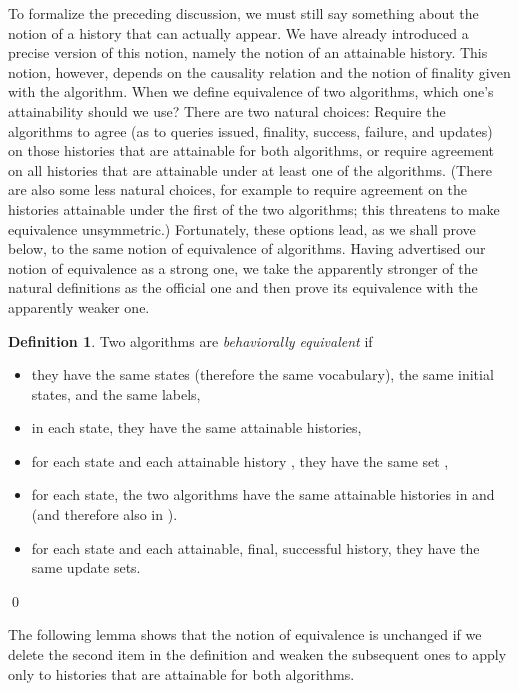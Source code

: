 \documentclass{LMCS}
\theoremstyle{definition}
\newtheorem{df}[thm]{Definition}
\newenvironment{ls}{\begin{itemize}}{\end{itemize}}
\begin{document}
To formalize the preceding discussion, we must still say something
about the notion of a history that can actually appear.  We have
already introduced a precise version of this notion, namely the notion
of an attainable history.  This notion, however, depends on the
causality relation and the notion of finality given with the
algorithm.  When we define equivalence of two algorithms, which one's
attainability should we use?  There are two natural choices: Require
the algorithms to agree (as to queries issued, finality, success,
failure, and updates) on those histories that are attainable for both
algorithms, or require agreement on all histories that are attainable
under at least one of the algorithms.  (There are also some less
natural choices, for example to require agreement on the histories
attainable under the first of the two algorithms; this threatens to
make equivalence unsymmetric.)  Fortunately, these options lead, as we
shall prove below, to the same notion of equivalence of algorithms.
Having advertised our notion of equivalence as a strong one, we take
the apparently stronger of the natural definitions as the official one
and then prove its equivalence with the apparently weaker one.

\begin{df}   \label{equiv-def}
Two algorithms are \emph{behaviorally equivalent} if
\begin{ls}
  \item they have the same states (therefore the same vocabulary), the
  same initial states, and the same labels,
  \item in each state, they have the same attainable histories,
  \item for each state  and each attainable history , they
  have the same set ,
  \item for each state, the two algorithms have the same attainable
  histories in 
  and  (and therefore also in ).
  \item for each state and each attainable, final, successful
  history, they have the same update sets.
\end{ls}
\qed\end{df}

The following lemma shows that the notion of equivalence is unchanged
if we delete the second item in the definition and weaken the
subsequent ones to apply only to histories that are attainable for
both algorithms.
\end{document}
